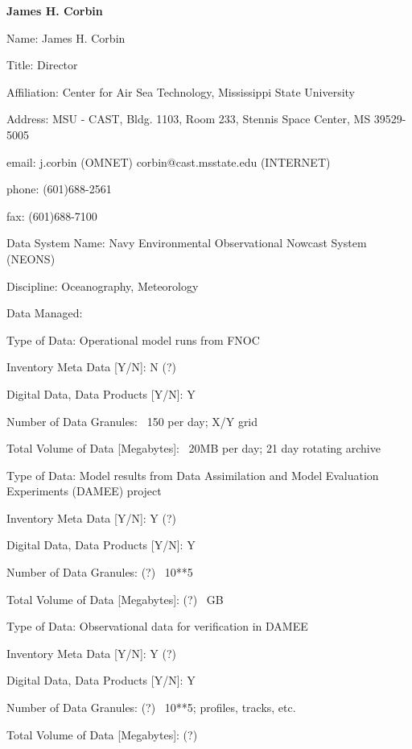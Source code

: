 \begin{center}
\LARGE
{\bf  James H. Corbin}
\end{center}
\large
{}
\normalsize
\smallskip
\begin{description}
\item{Name:}  James H. Corbin
\item{Title:}  Director
\item{Affiliation:}  Center for Air Sea Technology, Mississippi State 
University
\item{Address:}  MSU - CAST, Bldg. 1103, Room 233, Stennis Space Center, 
MS  39529-5005
\item{email:}  j.corbin (OMNET)
		corbin@cast.msstate.edu (INTERNET)
\item{phone:}  (601)688-2561
\item{fax:}  (601)688-7100
\end{description}
\medskip
\large
{}
\normalsize
\medskip
\begin{description}

\item{Data System Name:}  Navy Environmental Observational Nowcast 
System (NEONS)
\item{Discipline:}  Oceanography, Meteorology
\item{Data Managed:}
	\begin{description}
	\item{Type of Data:}  Operational model runs from FNOC
	\item{Inventory Meta Data [Y/N]:}  N (?)
	\item{Digital Data, Data Products [Y/N]:}  Y
	\item{Number of Data Granules:}  ~150 per day; X/Y grid
	\item{Total Volume of Data [Megabytes]:}  ~20MB per day; 21 day 
		rotating archive
\medskip
	\item{Type of Data:}  Model results from Data Assimilation and 
		Model Evaluation Experiments (DAMEE) project
	\item{Inventory Meta Data [Y/N]:}  Y (?)
	\item{Digital Data, Data Products [Y/N]:}  Y
	\item{Number of Data Granules:}  (?)  ~10**5
	\item{Total Volume of Data [Megabytes]:}  (?)  ~GB
\medskip
	\item{Type of Data:}  Observational data for verification in DAMEE
	\item{Inventory Meta Data [Y/N]:}  Y  (?)
	\item{Digital Data, Data Products [Y/N]:}  Y
	\item{Number of Data Granules:}  (?)  ~10**5; profiles, tracks, etc.
	\item{Total Volume of Data [Megabytes]:}  (?)
	\end{description}
\end{description}

